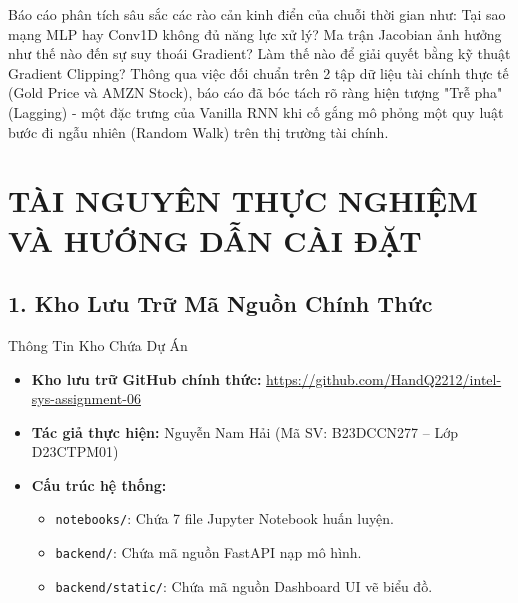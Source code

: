\documentclass[12pt,a4paper]{article}
\begin{document}
Báo cáo phân tích sâu sắc các rào cản kinh điển của chuỗi thời gian như: Tại sao mạng MLP hay Conv1D không đủ năng lực xử lý? Ma trận Jacobian ảnh hưởng như thế nào đến sự suy thoái Gradient? Làm thế nào để giải quyết bằng kỹ thuật Gradient Clipping? Thông qua việc đối chuẩn trên 2 tập dữ liệu tài chính thực tế (Gold Price và AMZN Stock), báo cáo đã bóc tách rõ ràng hiện tượng "Trễ pha" (Lagging) - một đặc trưng của Vanilla RNN khi cố gắng mô phỏng một quy luật bước đi ngẫu nhiên (Random Walk) trên thị trường tài chính.

\newpage

{}
\section*{TÀI NGUYÊN THỰC NGHIỆM VÀ HƯỚNG DẪN CÀI ĐẶT}

\subsection*{1. Kho Lưu Trữ Mã Nguồn Chính Thức}
\begin{mybox}{Thông Tin Kho Chứa Dự Án}
    \begin{itemize}[leftmargin=*]
        \item \textbf{Kho lưu trữ GitHub chính thức:} \href{https://github.com/HandQ2212/intel-sys-assignment-06}{\url{https://github.com/HandQ2212/intel-sys-assignment-06}}
        \item \textbf{Tác giả thực hiện:} Nguyễn Nam Hải (Mã SV: B23DCCN277 -- Lớp D23CTPM01)
        \item \textbf{Cấu trúc hệ thống:}
        \begin{itemize}
            \item \texttt{notebooks/}: Chứa 7 file Jupyter Notebook huấn luyện.
            \item \texttt{backend/}: Chứa mã nguồn FastAPI nạp mô hình.
            \item \texttt{backend/static/}: Chứa mã nguồn Dashboard UI vẽ biểu đồ.
        \end{itemize}
    \end{itemize}
\end{mybox}
\end{document}
